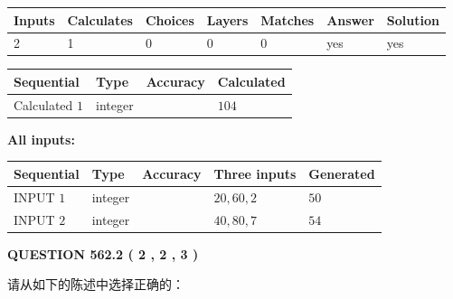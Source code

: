 \documentclass{ctexart}
\begin{document}
 
\noindent{}
 
 

 
   
   
   
   
\noindent\begin{tabular}{|l|l|l|l|l|l|l|}
 \hline
Inputs & Calculates & Choices & Layers & Matches & Answer & Solution \\ \hline
 2  & 
 1  & 
 0
  & 
 0  & 
 0  & 
  yes & 
  yes 
  \\ \hline
 \end{tabular}
   
   
   
   
\noindent{}
   
   
  
  
\noindent\begin{tabular}{|l|l|l|l|}
\hline
 Sequential & Type & Accuracy & Calculated \\ 
\hline
 
 
  Calculated $  1 $ & integer &  & 
  $ 104 $ 
 \\  \hline  
 \end{tabular}
   
   
   
   
\noindent\vspace{0.1in}\hspace{-0.08in} {\textbf{\Large{All inputs: }}}
   
   
  
  
\noindent\begin{tabular}{|l|l|l|l|l|}
\hline
 Sequential & Type & Accuracy & Three inputs & Generated \\ 
\hline
 
 
  INPUT $  1 $ & integer &  & $
 20
 , 
 60
 , 
 2
 $ & $ 50 $ 
 \\  \hline  
 
 
  INPUT $  2 $ & integer &  & $
 40
 , 
 80
 , 
 7
 $ & $ 54 $ 
 \\  \hline  
 \end{tabular}
   
   
  
\vspace{0.2in}
  
{\textbf{\Large{QUESTION
562.2 
 ( 2 , 2 , 3 )
}}}
  
  
请从如下的陈述中选择正确的：
 
\end{document}
